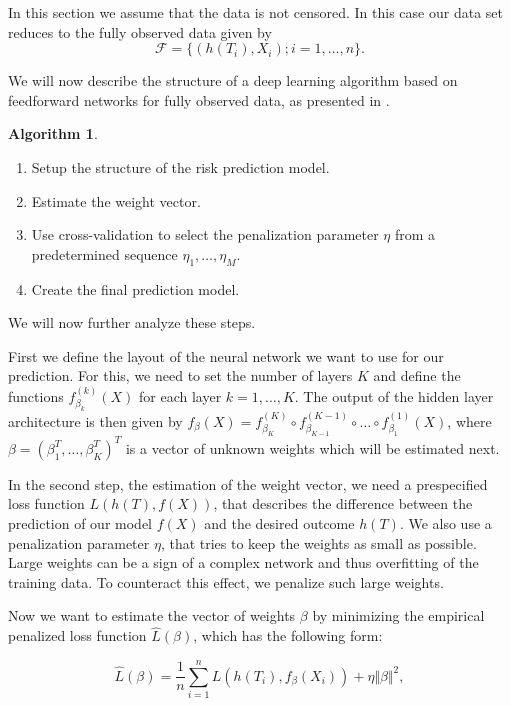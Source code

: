 \documentclass[12pt, a4paper]{article}
\theoremstyle{definition}
\newtheorem{Algorithm}{Algorithm}[section]
\theoremstyle{plain}
\numberwithin{equation}{section}
\numberwithin{figure}{section}
\numberwithin{table}{section}
\begin{document}
	In this section we assume that the data is not censored.
	In this case our data set reduces to the fully observed data given by
	\begin{equation*}
	\mathcal{F} =\{ \left( h(T_i), X_i\right); i = 1, \dots, n\}.
	\end{equation*}
	
	We will now describe the structure of a deep learning algorithm based on feedforward networks for fully observed data, as presented in \citet*{basearticle}.
	
	\begin{Algorithm}\label{alg:nocensor}
		~
	\begin{enumerate}
		\item Setup the structure of the risk prediction model.
		\item Estimate the weight vector.
		\item Use cross-validation to select the penalization parameter $\eta$ from a predetermined sequence $\eta_1,\dots,\eta_M$.
		\item Create the final prediction model.
	\end{enumerate}
	\end{Algorithm}

	We will now further analyze these steps.

	First we define the layout of the neural network we want to use for our prediction.
	For this, we need to set the number of layers $K$ and define the functions $f_{\beta_k}^{(k)}(X)$ for each layer $k = 1, \dots, K$.
	The output of the hidden layer architecture is then given by $f_{\beta}(X) = f_{\beta_K}^{(K)} \circ f_{\beta_{K-1}}^{(K-1)} \circ \dots \circ f_{\beta_1}^{(1)}(X)$, where $\beta = (\beta_1^T, \dots, \beta_K^T)^T$ is a vector of unknown weights which will be estimated next.
	
	In the second step, the estimation of the weight vector, we need a prespecified loss function $L(h(T), f(X))$, that describes the difference between the prediction of our model $f(X)$ and the desired outcome $h(T)$.
	We also use a penalization parameter $\eta$, that tries to keep the weights as small as possible.
	Large weights can be a sign of a complex network and thus overfitting of the training data.
	To counteract this effect, we penalize such large weights.
	
	
	Now we want to estimate the vector of weights $\beta$ by minimizing the empirical penalized loss function $\hat{L}(\beta)$, which has the following form:
	
	\begin{equation}\label{eq:eplf}
	\hat{L}(\beta) = \frac{1}{n} \sum_{i=1}^n L( h(T_i), f_{\beta}(X_i)) + \eta \Vert \beta \Vert ^2,
	\end{equation}
	
\end{document}
